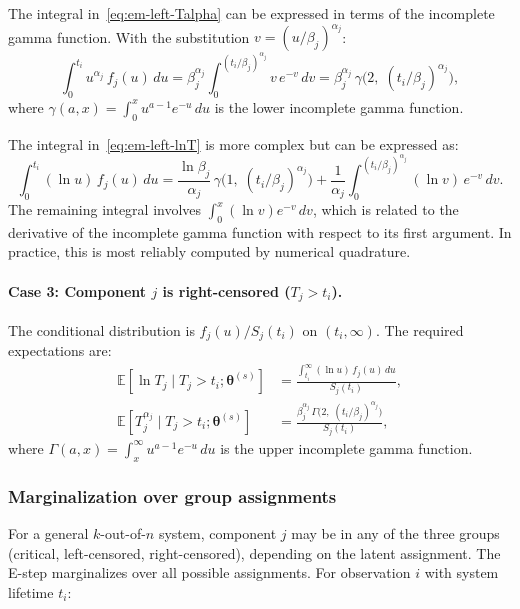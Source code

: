 \documentclass[12pt]{article}
\theoremstyle{definition}
\theoremstyle{remark}
\newcommand{\E}{\mathbb{E}}
\newcommand{\btheta}{\bm{\theta}}
\begin{document}
The integral in~\eqref{eq:em-left-Talpha} can be expressed in
terms of the incomplete gamma function.  With the substitution
$v = (u/\beta_j)^{\alpha_j}$:
\begin{equation}\label{eq:em-left-Talpha-gamma}
  \int_0^{t_i} u^{\alpha_j}\, f_j(u)\, du
  = \beta_j^{\alpha_j}
    \int_0^{(t_i/\beta_j)^{\alpha_j}}
    v\, e^{-v}\, dv
  = \beta_j^{\alpha_j}\, \gamma\!\bigl(2,\;
    (t_i/\beta_j)^{\alpha_j}\bigr),
\end{equation}
where $\gamma(a, x) = \int_0^x u^{a-1} e^{-u}\, du$ is the
lower incomplete gamma function.

The integral in~\eqref{eq:em-left-lnT} is more complex but can be
expressed as:
\begin{equation}\label{eq:em-left-lnT-formula}
  \int_0^{t_i} (\ln u)\, f_j(u)\, du
  = \frac{\ln \beta_j}{\alpha_j}\, \gamma\!\bigl(1,\;
    (t_i/\beta_j)^{\alpha_j}\bigr)
  + \frac{1}{\alpha_j}
    \int_0^{(t_i/\beta_j)^{\alpha_j}}
    (\ln v)\, e^{-v}\, dv.
\end{equation}
The remaining integral involves
$\int_0^x (\ln v) e^{-v}\, dv$, which is related to the
derivative of the incomplete gamma function with respect to its
first argument.  In practice, this is most reliably computed by
numerical quadrature.

\paragraph{Case 3: Component $j$ is right-censored ($T_j > t_i$).}
The conditional distribution is
$f_j(u) / S_j(t_i)$ on $(t_i, \infty)$.  The required
expectations are:
\begin{align}
  \E[\ln T_j \mid T_j > t_i; \btheta^{(s)}]
  &= \frac{\int_{t_i}^\infty (\ln u)\, f_j(u)\, du}{S_j(t_i)},
  \label{eq:em-right-lnT} \\
  \E[T_j^{\alpha_j} \mid T_j > t_i; \btheta^{(s)}]
  &= \frac{\beta_j^{\alpha_j}\,
    \Gamma\!\bigl(2,\; (t_i/\beta_j)^{\alpha_j}\bigr)}
    {S_j(t_i)},
  \label{eq:em-right-Talpha}
\end{align}
where $\Gamma(a, x) = \int_x^\infty u^{a-1} e^{-u}\, du$ is the
upper incomplete gamma function.

\subsubsection{Marginalization over group assignments}

For a general $k$-out-of-$n$ system, component $j$ may be in any
of the three groups (critical, left-censored, right-censored),
depending on the latent assignment.  The E-step marginalizes over
all possible assignments.  For observation $i$ with system lifetime
$t_i$:
\end{document}
